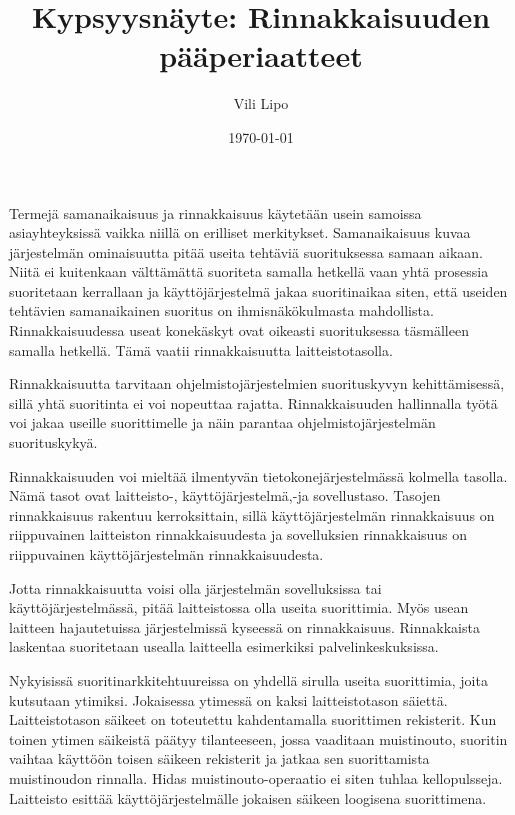 \documentclass[a4paper, 12pt]{article}
\author{ Vili Lipo}
\title{Kypsyysnäyte: Rinnakkaisuuden pääperiaatteet}
\date{\today}
\begin{document}
\maketitle
\newpage

Termejä samanaikaisuus ja rinnakkaisuus käytetään
usein samoissa asiayhteyksissä vaikka niillä on erilliset merkitykset.
Samanaikaisuus kuvaa järjestelmän ominaisuutta pitää useita
tehtäviä suorituksessa samaan aikaan. Niitä ei kuitenkaan välttämättä
suoriteta samalla hetkellä vaan yhtä prosessia suoritetaan kerrallaan
ja käyttöjärjestelmä jakaa suoritinaikaa siten, että useiden
tehtävien samanaikainen suoritus on ihmisnäkökulmasta mahdollista.
Rinnakkaisuudessa useat konekäskyt ovat
oikeasti suorituksessa täsmälleen samalla hetkellä.
Tämä vaatii rinnakkaisuutta laitteistotasolla.

Rinnakkaisuutta tarvitaan ohjelmistojärjestelmien
suorituskyvyn kehittämisessä, sillä yhtä suoritinta
ei voi nopeuttaa rajatta. Rinnakkaisuuden hallinnalla
työtä voi jakaa useille suorittimelle ja näin 
parantaa ohjelmistojärjestelmän suorituskykyä.

Rinnakkaisuuden voi mieltää ilmentyvän tietokonejärjestelmässä
kolmella tasolla. Nämä tasot ovat laitteisto-, käyttöjärjestelmä,-ja sovellustaso.
Tasojen rinnakkaisuus rakentuu kerroksittain, sillä käyttöjärjestelmän rinnakkaisuus
on riippuvainen laitteiston rinnakkaisuudesta ja sovelluksien rinnakkaisuus
on riippuvainen käyttöjärjestelmän rinnakkaisuudesta.

Jotta rinnakkaisuutta voisi olla järjestelmän sovelluksissa tai käyttöjärjestelmässä,
pitää laitteistossa olla useita suorittimia.
Myös usean laitteen hajautetuissa järjestelmissä kyseessä on rinnakkaisuus.
Rinnakkaista laskentaa suoritetaan usealla laitteella
esimerkiksi palvelinkeskuksissa.


Nykyisissä suoritinarkkitehtuureissa on yhdellä sirulla useita suorittimia,
joita kutsutaan ytimiksi. Jokaisessa ytimessä on kaksi laitteistotason
säiettä.
Laitteistotason säikeet on toteutettu kahdentamalla suorittimen rekisterit.
Kun toinen ytimen säikeistä päätyy tilanteeseen, jossa vaaditaan muistinouto, suoritin
vaihtaa käyttöön toisen säikeen rekisterit ja jatkaa sen suorittamista 
muistinoudon rinnalla. Hidas muistinouto-operaatio 
ei siten tuhlaa kellopulsseja.
Laitteisto esittää käyttöjärjestelmälle jokaisen säikeen loogisena suorittimena.
\end{document}
